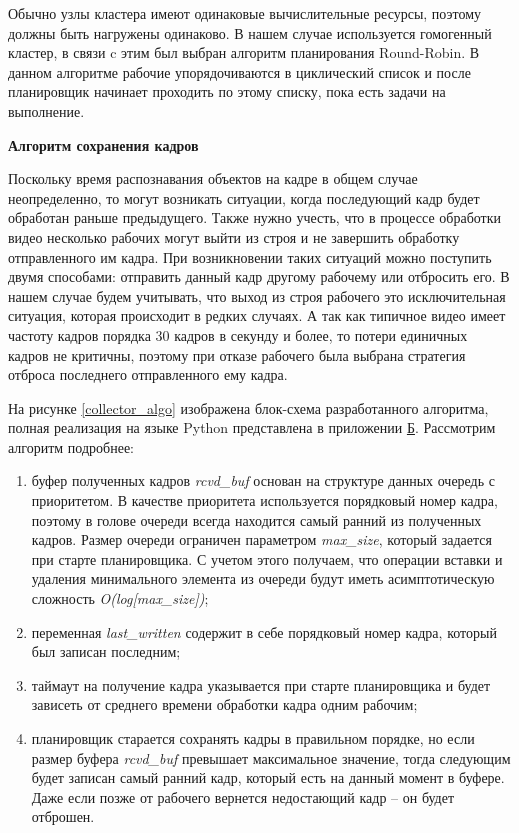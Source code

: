 Обычно узлы кластера имеют одинаковые вычислительные ресурсы, поэтому должны быть нагружены одинаково. В нашем случае 
используется гомогенный кластер, в связи c этим был выбран алгоритм планирования Round-Robin. В данном алгоритме рабочие
упорядочиваются в циклический список и после планировщик начинает проходить по этому списку, пока есть задачи на выполнение.

\clearpage

\textbf{Алгоритм сохранения кадров}

Поскольку время распознавания объектов на кадре в общем случае неопределенно, то могут возникать ситуации, когда последующий кадр
будет обработан раньше предыдущего. Также нужно учесть, что в процессе обработки видео несколько рабочих могут выйти из 
строя и не завершить обработку отправленного им кадра. При возникновении таких ситуаций можно поступить двумя способами:
отправить данный кадр другому рабочему или отбросить его. В нашем случае будем учитывать, что выход из строя рабочего это
исключительная ситуация, которая происходит в редких случаях. А так как типичное видео имеет частоту кадров порядка 30 кадров
в секунду и более, то потери единичных кадров не критичны, поэтому при отказе рабочего была выбрана
стратегия отброса последнего отправленного ему кадра.

На рисунке \ref{collector_algo} изображена блок-схема разработанного алгоритма, полная реализация на языке Python 
представлена в приложении \hyperlink{b-app}{Б}. Рассмотрим алгоритм подробнее:

\begin{enumerate}
\item буфер полученных кадров \emph{rcvd\_buf} основан на структуре данных очередь с приоритетом. В качестве приоритета 
используется порядковый номер кадра, поэтому в голове очереди всегда находится самый ранний из полученных кадров. Размер 
очереди ограничен параметром \emph{max\_size}, который задается при старте планировщика. С учетом этого получаем, что 
операции вставки и удаления минимального элемента из очереди будут иметь асимптотическую сложность \emph{O(log[max\_size])};
\item переменная \emph{last\_written} содержит в себе порядковый номер кадра, который был записан последним;
\item таймаут на получение кадра указывается при старте планировщика и будет зависеть от среднего времени 
обработки кадра одним рабочим;
\item планировщик старается сохранять кадры в правильном порядке, но если размер буфера \emph{rcvd\_buf} превышает
максимальное значение, тогда следующим будет записан самый ранний кадр, который есть на данный момент в буфере. Даже 
если позже от рабочего вернется недостающий кадр -- он будет отброшен.
\end{enumerate}

